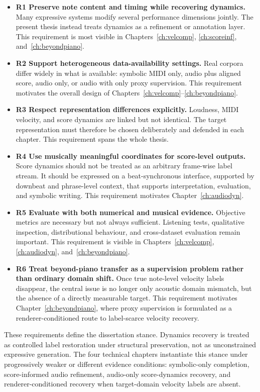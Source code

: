 \begin{itemize}
    \item \textbf{R1 Preserve note content and timing while recovering dynamics.} Many expressive systems modify several performance dimensions jointly. The present thesis instead treats dynamics as a refinement or annotation layer. This requirement is most visible in Chapters~\ref{ch:velcomp}, \ref{ch:scoreinf}, and~\ref{ch:beyondpiano}.

    \item \textbf{R2 Support heterogeneous data-availability settings.} Real corpora differ widely in what is available: symbolic MIDI only, audio plus aligned score, audio only, or audio with only proxy supervision. This requirement motivates the overall design of Chapters~\ref{ch:velcomp}--\ref{ch:beyondpiano}.

    \item \textbf{R3 Respect representation differences explicitly.} Loudness, MIDI velocity, and score dynamics are linked but not identical. The target representation must therefore be chosen deliberately and defended in each chapter. This requirement spans the whole thesis.

    \item \textbf{R4 Use musically meaningful coordinates for score-level outputs.} Score dynamics should not be treated as an arbitrary frame-wise label stream. It should be expressed on a beat-synchronous interface, supported by downbeat and phrase-level context, that supports interpretation, evaluation, and symbolic writing. This requirement motivates Chapter~\ref{ch:audiodyn}.

    \item \textbf{R5 Evaluate with both numerical and musical evidence.} Objective metrics are necessary but not always sufficient. Listening tests, qualitative inspection, distributional behaviour, and cross-dataset evaluation remain important. This requirement is visible in Chapters~\ref{ch:velcomp}, \ref{ch:audiodyn}, and~\ref{ch:beyondpiano}.

    \item \textbf{R6 Treat beyond-piano transfer as a supervision problem rather than ordinary domain shift.} Once true note-level velocity labels disappear, the central issue is no longer only acoustic domain mismatch, but the absence of a directly measurable target. This requirement motivates Chapter~\ref{ch:beyondpiano}, where proxy supervision is formulated as a renderer-conditioned route to label-scarce velocity recovery.
\end{itemize}

These requirements define the dissertation stance. Dynamics recovery is treated as controlled label restoration under structural preservation, not as unconstrained expressive generation. The four technical chapters instantiate this stance under progressively weaker or different evidence conditions: symbolic-only completion, score-informed audio refinement, audio-only score-dynamics recovery, and renderer-conditioned recovery when target-domain velocity labels are absent.